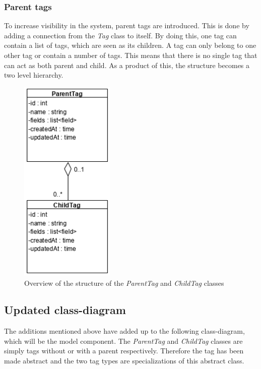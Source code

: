 
\subsubsection{Parent tags}
To increase visibility in the system, parent tags are introduced. This is done by adding a connection from the \textit{Tag} class to itself. By doing this, one tag can contain a list of tags, which are seen as its children. A tag can only belong to one other tag or contain a number of tags. This means that there is no single tag that can act as both parent and child. As a product of this, the structure becomes a two level hierarchy.

\begin{figure}[H]
    \centering
    \includegraphics[width=0.4\textwidth]{figures/Structures/TagHierarchy.png}
    \caption{Overview of the structure of the \textit{ParentTag} and \textit{ChildTag} classes}
    \label{fig:TagHierarchy}
\end{figure}

\subsection{Updated class-diagram}
The additions mentioned above have added up to the following class-diagram, which will be the model component. The \textit{ParentTag} and \textit{ChildTag} classes are simply tags without or with a parent respectively. Therefore the tag has been made abstract and the two tag types are specializations of this abstract class.

